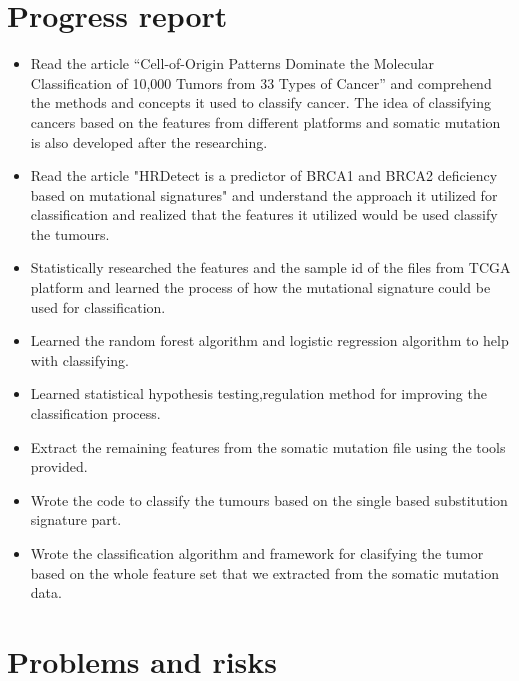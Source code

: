 \documentclass[11pt]{article}
\begin{document}
\newpage
\section{Progress report}\label{progress-report}

\begin{itemize}
\item Read the article “Cell-of-Origin Patterns Dominate the Molecular Classification of 10,000 Tumors from 33 Types of Cancer” and comprehend the methods and concepts it used to classify cancer. The idea of classifying cancers based on the features from different platforms and somatic mutation is also developed after the researching.

\item Read the article "HRDetect is a predictor of BRCA1 and BRCA2 deficiency based on mutational signatures" and understand the approach it utilized for classification and realized that the features it utilized would be used classify the tumours.

\item Statistically researched the features and the sample id of the files from TCGA platform and learned the process of how the mutational signature could be used for classification.

\item Learned the random forest algorithm and logistic regression algorithm to help with classifying.

\item Learned statistical hypothesis testing,regulation method for improving the classification process.

\item Extract the remaining features from the somatic mutation file using the tools provided.

\item Wrote the code to classify the tumours based on the single based substitution signature part.

\item Wrote the classification algorithm and framework for clasifying the tumor based on the whole feature set that we extracted from the somatic mutation data.
\end{itemize}

\section{Problems and risks}\label{problems-and-risks}
\end{document}
